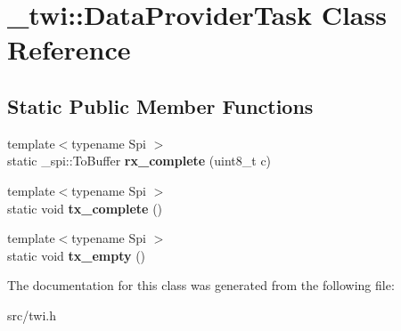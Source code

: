 \hypertarget{class__twi_1_1DataProviderTask}{}\section{\+\_\+twi\+:\+:Data\+Provider\+Task Class Reference}
\label{class__twi_1_1DataProviderTask}
\subsection*{Static Public Member Functions}
\begin{DoxyCompactItemize}
\item 
{\footnotesize template$<$typename Spi $>$ }\\static \+\_\+spi\+::\+To\+Buffer {\bfseries rx\+\_\+complete} (uint8\+\_\+t c)\hypertarget{class__twi_1_1DataProviderTask_a97ec8438e4392efbc82b9986898e3a6f}{}\label{class__twi_1_1DataProviderTask_a97ec8438e4392efbc82b9986898e3a6f}

\item 
{\footnotesize template$<$typename Spi $>$ }\\static void {\bfseries tx\+\_\+complete} ()\hypertarget{class__twi_1_1DataProviderTask_a798713533cf2de2ac0961a3c84c5021b}{}\label{class__twi_1_1DataProviderTask_a798713533cf2de2ac0961a3c84c5021b}

\item 
{\footnotesize template$<$typename Spi $>$ }\\static void {\bfseries tx\+\_\+empty} ()\hypertarget{class__twi_1_1DataProviderTask_af36db8eb3879e9a0229fbfd2d24a8c01}{}\label{class__twi_1_1DataProviderTask_af36db8eb3879e9a0229fbfd2d24a8c01}

\end{DoxyCompactItemize}


The documentation for this class was generated from the following file\+:\begin{DoxyCompactItemize}
\item 
src/twi.\+h\end{DoxyCompactItemize}
